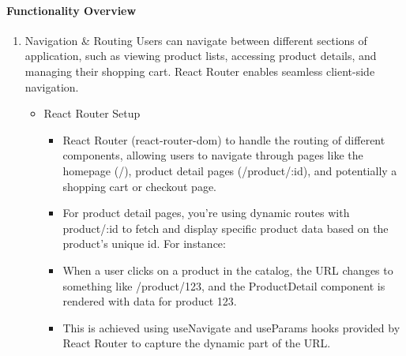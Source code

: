\documentclass{llncs}
\begin{document}
\paragraph{Functionality Overview}
\begin{enumerate}
    \item Navigation \& Routing
          Users can navigate between different sections of application, such as viewing product lists, accessing product details, and managing their shopping cart. React Router enables seamless client-side navigation.
          \begin{itemize}
              \item React Router Setup
                    \begin{itemize}
                        \item React Router (react-router-dom) to handle the routing of different components, allowing users to navigate through pages like the homepage (/), product detail pages (/product/:id), and potentially a shopping cart or checkout page.
                        \item For product detail pages, you're using dynamic routes with product/:id to fetch and display specific product data based on the product’s unique id. For instance:
                        \item When a user clicks on a product in the catalog, the URL changes to something like /product/123, and the ProductDetail component is rendered with data for product 123.
                        \item This is achieved using useNavigate and useParams hooks provided by React Router to capture the dynamic part of the URL.
                    \end{itemize}


\end{itemize}
\end{enumerate}
\end{document}

